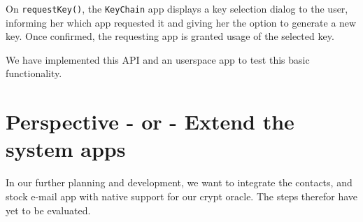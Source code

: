 \documentclass[a4paper,draft]{scrartcl}
\begin{document}
	On \texttt{requestKey()}, the \texttt{KeyChain} app displays a key selection dialog to the user, informing her which app requested it and giving her the option to generate a new key. Once confirmed, the requesting app is granted usage of the selected key.

	We have implemented this API and an userspace app to test this basic functionality.

\section{Perspective - or - Extend the system apps}
In our further planning and development, we want to integrate the contacts, and stock e-mail app with native support for our crypt oracle. The steps therefor have yet to be evaluated.
\end{document}
